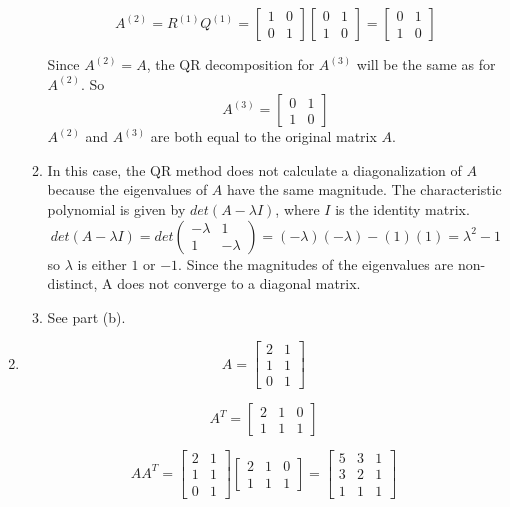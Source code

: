 \documentclass[12pt]{article}
\begin{document}
\begin{enumerate}[leftmargin=0em]
\begin{enumerate}[leftmargin=!]
        \[A^{(2)} = R^{(1)}Q^{(1)} = \left[\begin{matrix}1&0\\ 0&1\end{matrix}\right]\left[\begin{matrix}0&1\\ 1&0\end{matrix}\right] = \left[\begin{matrix}0&1\\ 1&0\end{matrix}\right]\]

        Since \(A^{(2)}=A\), the QR decomposition for $A^{(3)}$ will be the same as for $A^{(2)}$. So
        \[A^{(3)} = \left[\begin{matrix}0&1\\ 1&0\end{matrix}\right]\]
        \(A^{(2)}\) and \(A^{(3)}\) are both equal to the original matrix \(A\).
        
        \item
        In this case, the QR method does not calculate a diagonalization of $A$ because the eigenvalues of $A$ have the same magnitude. The characteristic polynomial is given by \(det(A-\lambda I)\), where \(I\) is the identity matrix.
        \[det(A-\lambda I)=det\left(\begin{matrix}-\lambda &1\\ 1&-\lambda \end{matrix}\right)=(-\lambda )(-\lambda )-(1)(1)=\lambda ^{2}-1\]
        so $\lambda$ is either $1$ or $-1$. Since the magnitudes of the eigenvalues are non-distinct, A does not converge to a diagonal matrix.

        \item
        See part (b).

    \end{enumerate}
    
    \item
    \[
A = \begin{bmatrix}
2 & 1 \\
1 & 1 \\
0 & 1
\end{bmatrix}
\]

\[
A^T = \begin{bmatrix}
2 & 1 & 0 \\
1 & 1 & 1
\end{bmatrix}
\]


\[
AA^T = \begin{bmatrix}
2 & 1 \\
1 & 1 \\
0 & 1
\end{bmatrix}
\begin{bmatrix}
2 & 1 & 0 \\
1 & 1 & 1
\end{bmatrix}
=
\begin{bmatrix}
5 & 3 & 1 \\
3 & 2 & 1 \\
1 & 1 & 1
\end{bmatrix}
\]


\end{enumerate}
\end{document}
